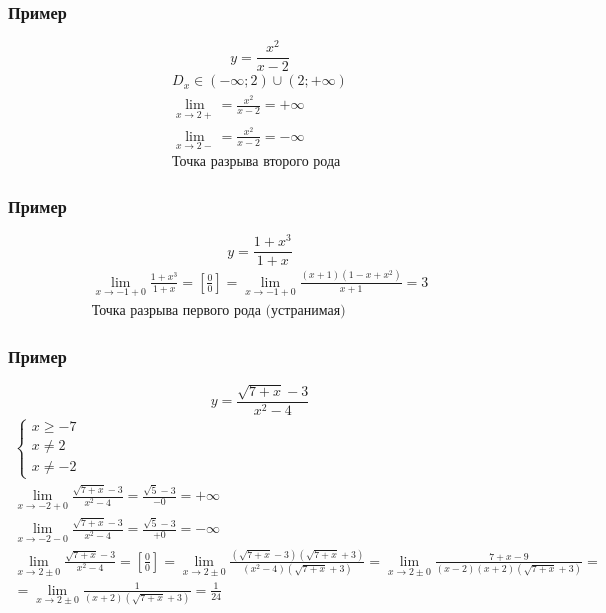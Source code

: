 \documentclass{article}
\begin{document}
\subsubsection{Пример}
\[
    y = \frac{x^2}{x - 2}
\]
\begin{gather*}
    D_x \in (-\infty; 2) \cup (2; +\infty) \\
    \lim_{x \to 2+} = \frac{x^2}{x - 2} = +\infty \\
    \lim_{x \to 2-} = \frac{x^2}{x - 2} = -\infty \\
    \text{Точка разрыва второго рода}
\end{gather*}

\subsubsection{Пример}
\[
    y = \frac{1 + x^3}{1 + x}
\]
\begin{gather*}
    \lim_{x \to -1 + 0} \frac{1 + x^3}{1 + x} = 
    \left[ \frac{0}{0} \right] =
    \lim_{x \to -1 + 0} \frac{(x + 1)(1 - x + x^2)}{x + 1} = 3 \\
    \text{Точка разрыва первого рода (устранимая)}
\end{gather*}

\subsubsection{Пример}
\[
    y = \frac{\sqrt{7 + x} - 3}{x^2 - 4}
\]
\begin{gather*}
    \begin{cases}
        x \ge -7 \\
        x \neq 2 \\
        x \neq -2
    \end{cases} \\
    \lim_{x \to -2 + 0} \frac{\sqrt{7 + x} - 3}{x^2 - 4} =
    \frac{\sqrt{5} - 3}{-0} = +\infty \\
    \lim_{x \to -2 - 0} \frac{\sqrt{7 + x} - 3}{x^2 - 4} =
    \frac{\sqrt{5} - 3}{+0} = -\infty \\
    \lim_{x \to 2 \pm 0} \frac{\sqrt{7 + x} - 3}{x^2 - 4} =
    \left[ \frac{0}{0} \right] =
    \lim_{x \to 2 \pm 0} \frac{(\sqrt{7 + x} - 3)(\sqrt{7 + x} + 3)}{(x^2 - 4)(\sqrt{7 + x} + 3)} =
    \lim_{x \to 2 \pm 0} \frac{7 + x - 9}{(x - 2)(x + 2)(\sqrt{7 + x} + 3)} = \\
    = \lim_{x \to 2 \pm 0} \frac{1}{(x + 2)(\sqrt{7 + x} + 3)} = 
    \frac{1}{24}
\end{gather*}
\end{document}
